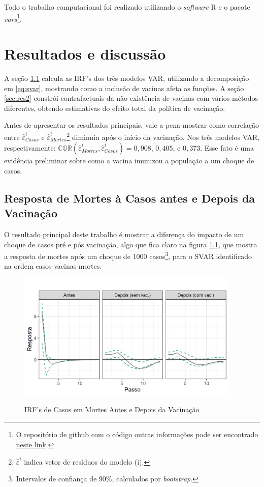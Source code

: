 \documentclass[
	12pt,				%
	oneside,			%
	a4paper,			%
	english,			%
	brazil				%
	hyperref = {colorlinks, citecolor=c1d, linkcolor=c2d, urlcolor=c3d, colorlinks}
	]{abntex2}
\begin{document}
Todo o trabalho computacional foi realizado utilizando o \textit{software} R e o pacote \textit{vars}\footnote{O repositório de github com o código outras informações pode ser encontrado \href{https://github.com/ricardo-semiao/TCC-Graduacao}{neste link}.}.

\let\clearpage\relax
\chapter{Resultados e discussão}

A seção \ref{sec:res1} calcula as IRF's dos três modelos VAR, utilizando a decomposição em \eqref{eq:svar}, mostrando como a inclusão de vacinas afeta as funções. A seção \ref{sec:res2} constrói contrafactuais da não existência de vacinas com vários métodos diferentes, obtendo estimativas do efeito total da política de vacinação.

Antes de apresentar os resultados principais, vale a pena mostrar como correlação entre $\hat{\varepsilon}^i_{Casos}$ e $\hat{\varepsilon}^i_{Mortes}$\footnote{$\hat{\varepsilon}^i$ indica vetor de resíduos do modelo (i).} diminuiu após o início da vacinação. Nos três modelos VAR, respectivamente: $\mathbb{COR}(\hat{\varepsilon}^i_{Mortes}, \hat{\varepsilon}^i_{Casos}) = 0,908$, $0,405$, e $0,373$. Esse fato é uma evidência preliminar sobre como a vacina imunizou a população a um choque de casos.

\section{Resposta de Mortes à Casos antes e Depois da Vacinação}\label{sec:res1}
O resultado principal deste trabalho é mostrar a diferença do impacto de um choque de casos pré e pós vacinação, algo que fica claro na figura \ref{fig:IRF BaA}, que mostra a resposta de mortes após um choque de 1000 casos\footnote{Intervalos de confiança de 90\%, calculados por \textit{bootstrap}.}, para o SVAR identificado na ordem casos-vacinas-mortes.

\begin{figure}[H]
    \centering
    \caption{IRF's de Casos em Mortes Antes e Depois da Vacinação}
    \includegraphics[width = 0.95\textwidth]{Figuras/IRF BaA CVM.png}
    \label{fig:IRF BaA}
\end{figure}
\end{document}
